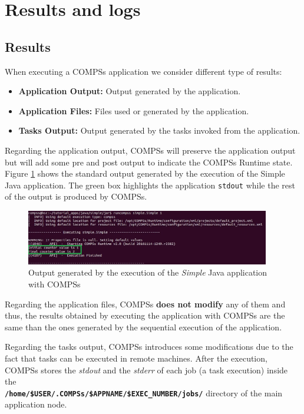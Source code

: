  \section{Results and logs}
\label{sec:Results_and_Logs}

\subsection{Results}
When executing a COMPSs application we consider different type of results:
\begin{itemize}
 \item \textbf{Application Output:} Output generated by the application.
 \item \textbf{Application Files:}  Files used or generated by the application.
 \item \textbf{Tasks Output:} Output generated by the tasks invoked from the application.
\end{itemize}

Regarding the application output, COMPSs will preserve the application output but will add some pre and post output to indicate
the COMPSs Runtime state. Figure \ref{fig:compss_out} shows the standard output generated by the execution of the 
Simple Java application. The green box highlights the application \texttt{stdout} while the rest of the output is produced by COMPSs.  
\begin{figure}[h!]
  \centering
    \includegraphics[width=0.95\textwidth]{./Sections/3_Results_and_Logs/Figures/simple_java_stdout.jpeg}
    \caption{Output generated by the execution of the \textit{Simple} Java application with COMPSs}
    \label{fig:compss_out}
\end{figure}

Regarding the application files, COMPSs \textbf{does not modify} any of them and thus, the
results obtained by executing the application with COMPSs are the same than the ones generated by the sequential execution
of the application.

Regarding the tasks output, COMPSs introduces some modifications due to the fact that tasks can be executed in remote
machines. After the execution, COMPSs stores the \textit{stdout} and the \textit{stderr} of each job (a task execution) inside the\\ \textbf{\texttt{/home/\$USER/.COMPSs/\$APPNAME/\$EXEC\_NUMBER/jobs/}} directory of the main application node.

